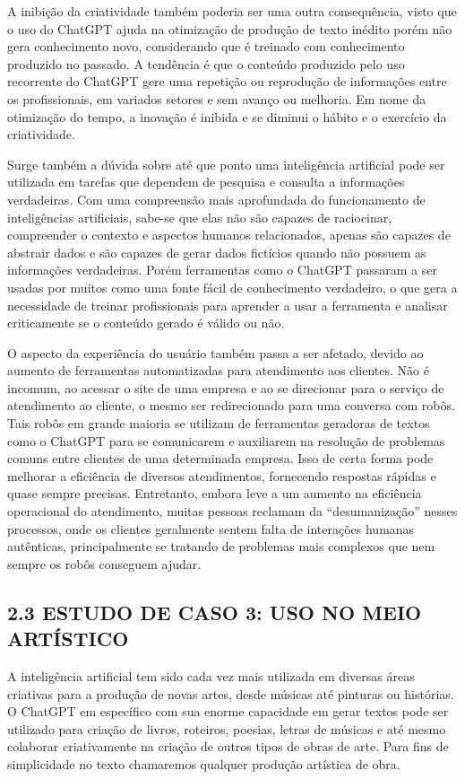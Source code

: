 A inibição da criatividade também poderia ser uma outra consequência, visto que o uso do ChatGPT ajuda na otimização de produção de texto inédito porém não gera conhecimento novo, considerando que é treinado com conhecimento produzido no passado. A tendência é que o conteúdo produzido pelo uso recorrente do ChatGPT gere uma repetição ou reprodução de informações entre os profissionais, em variados setores e sem avanço ou melhoria. Em nome da otimização do tempo, a inovação é inibida e se diminui o hábito e o exercício da criatividade.

Surge também a dúvida sobre até que ponto uma inteligência artificial pode ser utilizada em tarefas que dependem de pesquisa e consulta a informações verdadeiras. Com uma compreensão mais aprofundada do funcionamento de inteligências artificiais, sabe-se que elas não são capazes de raciocinar, compreender o contexto e aspectos humanos relacionados, apenas são capazes de abstrair dados e são capazes de gerar dados fictícios quando não possuem as informações verdadeiras. Porém ferramentas como o ChatGPT passaram a ser usadas por muitos como uma fonte fácil de conhecimento verdadeiro, o que gera a necessidade de treinar profissionais para aprender a usar a ferramenta e analisar criticamente se o conteúdo gerado é válido ou não.

O aspecto da experiência do usuário também passa a ser afetado, devido ao aumento de ferramentas automatizadas para atendimento aos clientes. Não é incomum, ao acessar o site de uma empresa e ao se direcionar para o serviço de atendimento ao cliente, o mesmo ser redirecionado para uma conversa com robôs. Tais robôs em grande maioria se utilizam de ferramentas geradoras de textos como o ChatGPT para se comunicarem e auxiliarem na resolução de problemas comuns entre clientes de uma determinada empresa. Isso de certa forma pode melhorar a eficiência de diversos atendimentos, fornecendo respostas rápidas e quase sempre precisas. Entretanto, embora leve a um aumento na eficiência operacional do atendimento, muitas pessoas reclamam da “desumanização” nesses processos, onde os clientes geralmente sentem falta de interações humanas autênticas, principalmente se tratando de problemas mais complexos que nem sempre os robôs conseguem ajudar. 


\subsection*{{2.3 ESTUDO DE CASO 3: USO NO MEIO ARTÍSTICO}}
A inteligência artificial tem sido cada vez mais utilizada em diversas áreas criativas para a produção de novas artes, desde músicas até pinturas ou histórias. O ChatGPT em específico com sua enorme capacidade em gerar textos pode ser utilizado para criação de livros, roteiros, poesias, letras de músicas e até mesmo colaborar criativamente na criação de outros tipos de obras de arte. Para fins de simplicidade no texto chamaremos qualquer produção artística de obra. 


